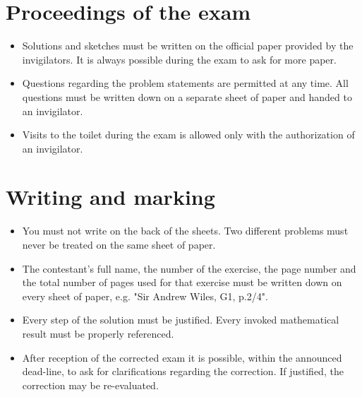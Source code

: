 \documentclass[12pt,a4paper]{article}
\begin{document}
\section{Proceedings of the exam}
\begin{itemize}

\item Solutions and sketches must be written on the official paper provided by the invigilators. It is always possible during the exam to ask for more paper.

\item Questions regarding the problem statements are permitted at any time. All questions must be written down on a separate sheet of paper and handed to an invigilator.

\item Visits to the toilet during the exam is allowed only with the authorization  of an invigilator.

\end{itemize}

\section{Writing and marking}
\begin{itemize}
\item You must not write on the back of the sheets. Two different problems must never be treated on the same sheet of paper.
\item The contestant's full name, the number of the exercise, the page number and the total number of pages used for that exercise must be written down on every sheet of paper, e.g. "Sir Andrew Wiles, G1, p.2/4".
\item Every step of the solution must be justified. Every invoked mathematical result must be properly referenced.
\item After reception of the corrected exam it is possible, within the announced dead-line, to ask for clarifications regarding the correction. If justified, the correction may be re-evaluated.
\end{itemize}
\end{document}
